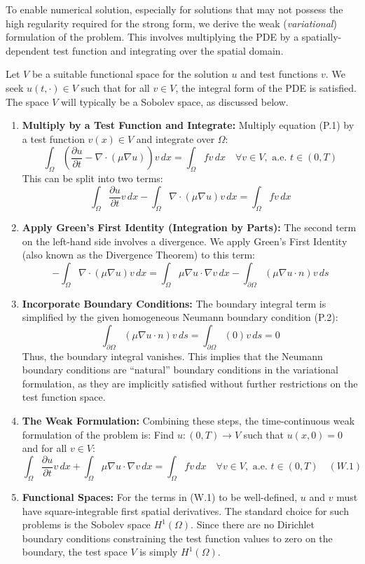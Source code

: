 \documentclass[
  11pt,
]{article}
\begin{document}
To enable numerical solution, especially for solutions that may not
possess the high regularity required for the strong form, we derive the
weak (\textit{variational}) formulation of the problem. This involves multiplying
the PDE by a spatially-dependent test function and integrating over the
spatial domain.

Let $V$ be a suitable functional space for the solution $u$ and test
functions $v$. We seek $u(t, \cdot) \in V$ such that for all
$v \in V$, the integral form of the PDE is satisfied. The space $V$
will typically be a Sobolev space, as discussed below.

\begin{enumerate}
\def\labelenumi{\arabic{enumi}.}
\item
  \textbf{Multiply by a Test Function and Integrate:} Multiply equation
  (P.1) by a test function $v(x) \in V$ and integrate over $\Omega$:
  \[
  \int_{\Omega} \left( \frac{\partial u}{\partial t} - \nabla \cdot (\mu \nabla u) \right) v \, dx = \int_{\Omega} f v \, dx \quad \forall v \in V, \text{ a.e. } t \in (0, T)
  \] This can be split into two terms: \[
  \int_{\Omega} \frac{\partial u}{\partial t} v \, dx - \int_{\Omega} \nabla \cdot (\mu \nabla u) v \, dx = \int_{\Omega} f v \, dx
  \]
\item
  \textbf{Apply Green's First Identity (Integration by Parts):} The
  second term on the left-hand side involves a divergence. We apply
  Green's First Identity (also known as the Divergence Theorem) to this
  term: \[
  - \int_{\Omega} \nabla \cdot (\mu \nabla u) v \, dx = \int_{\Omega} \mu \nabla u \cdot \nabla v \, dx - \int_{\partial \Omega} (\mu \nabla u \cdot n) v \, ds
  \]
\item
  \textbf{Incorporate Boundary Conditions:} The boundary integral term
  is simplified by the given homogeneous Neumann boundary condition
  (P.2): \[
  \int_{\partial \Omega} (\mu \nabla u \cdot n) v \, ds = \int_{\partial \Omega} (0) v \, ds = 0
  \] Thus, the boundary integral vanishes. This implies that the Neumann
  boundary conditions are ``natural'' boundary conditions in the
  variational formulation, as they are implicitly satisfied without
  further restrictions on the test function space.
\item
  \textbf{The Weak Formulation:} Combining these steps, the
  time-continuous weak formulation of the problem is: Find
  $u: (0, T) \to V$ such that $u(x,0)=0$ and for all $v \in V$: \[
  \int_{\Omega} \frac{\partial u}{\partial t} v \, dx + \int_{\Omega} \mu \nabla u \cdot \nabla v \, dx = \int_{\Omega} f v \, dx \quad \forall v \in V, \text{ a.e. } t \in (0, T) \quad (W.1)
  \]
\item
  \textbf{Functional Spaces:} For the terms in (W.1) to be well-defined,
  $u$ and $v$ must have square-integrable first spatial derivatives.
  The standard choice for such problems is the Sobolev space
  $H^1(\Omega)$. Since there are no Dirichlet boundary conditions
  constraining the test function values to zero on the boundary, the
  test space $V$ is simply $H^1(\Omega)$.


\end{enumerate}
\end{document}
